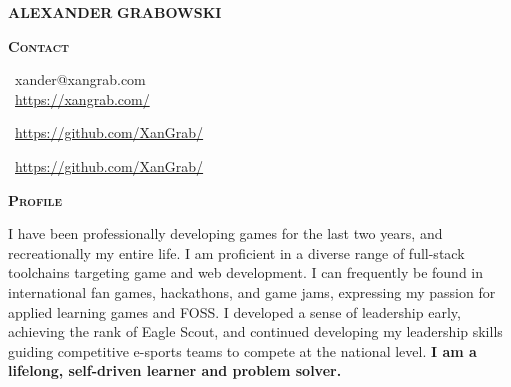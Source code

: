 \documentclass[11pt, a4paper]{article}
\newcommand{\headleft}[1]{\vspace*{3ex}\textsc{\textbf{#1}}\par%
    \vspace*{-1.5ex}\hrulefill\par\vspace*{0.2ex}}
\begin{document}
\setlength{\topskip}{0pt}
\setlength{\parindent}{0pt}
\setlength{\parskip}{0pt}
\setlength{\fboxsep}{0pt}
\pagestyle{empty}
\raggedbottom

\begin{minipage}[t]{0.33\textwidth} %
\colorbox{cvblue}{\begin{minipage}[t][5mm][t]{\textwidth}\null\hfill\null\end{minipage}}

\vspace{-.2ex} %
\colorbox{cvblue!90}{\color{white}  %
\textwidth\relax%
\begin{minipage}[t][293mm][t]{0.82\textwidth}
\raggedright
\vspace*{2.0ex}

\begin{center}
    \Huge \textbf{ALEXANDER}\vspace{0.5ex}
    \textbf{GRABOWSKI} \normalsize 
\end{center}


\vspace*{-2.5ex} 

\headleft{Contact}
\small %
\faEnvelope\ {\small  xander@xangrab.com} \\[0.4ex]

\faGlobe\ \href{https://xangrab.com/}{https://xangrab.com/}\vspace{0.5ex}

\faGithub\ \href{https://github.com/XanGrab/}{https://github.com/XanGrab/} \\[0.1ex] \vspace{0.5ex}

\faItchIo\ \href{https://github.com/XanGrab/}{https://github.com/XanGrab/} \\[0.1ex]

\normalsize

\headleft{Profile}
I have been professionally developing games for the last two years, and recreationally my entire life. I am proficient in a diverse range of full-stack toolchains targeting game and web development. I can frequently be found in international fan games, hackathons, and game jams, expressing my passion for applied learning games and FOSS. I developed a sense of leadership early, achieving the rank of Eagle Scout, and continued developing my leadership skills guiding competitive e-sports teams to compete at the national level. \textbf{I am a lifelong, self-driven learner and problem solver.}


\end{minipage}}
\end{minipage}
\end{document}
